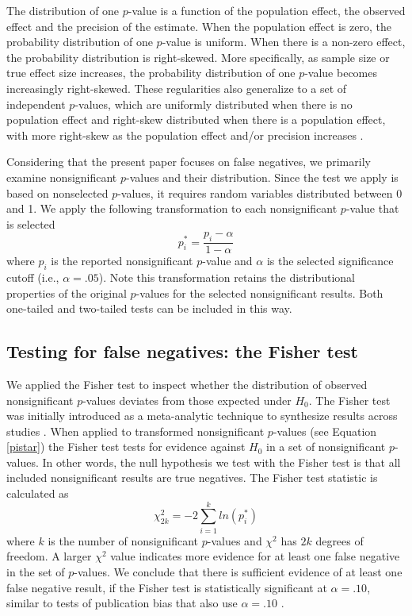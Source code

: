 \documentclass{article}
\begin{document}
The distribution of one $p$-value is a function of the population effect, the observed effect and the precision of the estimate. When the population effect is zero, the probability distribution of one $p$-value is uniform. When there is a non-zero effect, the probability distribution is right-skewed. More specifically, as sample size or true effect size increases, the probability distribution of one $p$-value becomes increasingly right-skewed. These regularities also generalize to a set of independent $p$-values, which are uniformly distributed when there is no population effect and right-skew distributed when there is a population effect, with more right-skew as the population effect and/or precision increases \cite{Fisher1925-jl}.

Considering that the present paper focuses on false negatives, we primarily examine nonsignificant $p$-values and their distribution. Since the test we apply is based on nonselected $p$-values, it requires random variables distributed between 0 and 1. We apply the following transformation to each nonsignificant $p$-value that is selected
\begin{equation}
\label{pistar}
p^*_i=\frac{p_i-\alpha}{1-\alpha}
\end{equation}
where $p_i$ is the  reported nonsignificant $p$-value and $\alpha$ is the selected significance cutoff (i.e., $\alpha=.05$). Note this transformation retains the distributional properties of the original $p$-values for the selected nonsignificant results. Both one-tailed and two-tailed tests can be included in this way.

\subsection*{Testing for false negatives: the Fisher test}

We applied the Fisher test to inspect whether the distribution of observed nonsignificant $p$-values deviates from those expected under $H_0$. The Fisher test was initially introduced as a meta-analytic technique to synthesize results across studies \cite{Fisher1925-jl,Hedges1985-dy}. When applied to transformed nonsignificant $p$-values (see Equation \ref{pistar}) the Fisher test tests for evidence against $H_0$ in a set of nonsignificant $p$-values. In other words, the null hypothesis we test with the Fisher test is that all included nonsignificant results are true negatives. The Fisher test statistic is calculated as
\begin{equation}
\label{fishertest}
\chi^2_{2k}=-2\sum\limits^k_{i=1}ln(p^*_i)
\end{equation}
where $k$ is the number of nonsignificant $p$-values and $\chi^2$ has $2k$ degrees of freedom. A larger $\chi^2$ value indicates more evidence for at least one false negative in the set of $p$-values. We conclude that there is sufficient evidence of at least one false negative result, if the Fisher test is statistically significant at $\alpha=.10$, similar to tests of publication bias that also use $\alpha=.10$ \cite{Sterne2000-wh,Ioannidis2007-hh,Francis2012-kw}.
\end{document}
